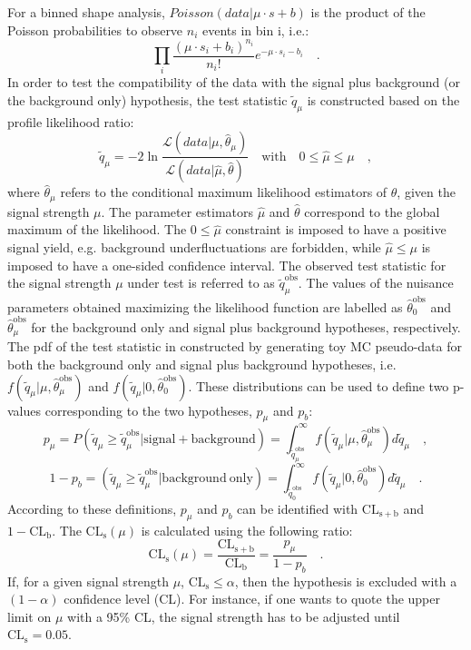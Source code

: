 For a binned shape analysis, $Poisson(data|\mu\cdot s + b)$ is the product of the Poisson probabilities to observe $n_i$ events in bin i, i.e.:
\begin{equation}
\prod_i \frac{(\mu\cdot s_i + b_i)^{n_i}}{n_i !} e^{-\mu\cdot s_i - b_i} \quad.
\end{equation}
In order to test the compatibility of the data with the signal plus background (or the background only) hypothesis, the test statistic $\tilde{q}_\mu$ is constructed based on the profile likelihood ratio:
\begin{equation}
\tilde{q}_\mu = -2 \ln{\frac{\mathcal{L}(data|\mu,\hat{\theta}_\mu)}{\mathcal{L}(data|\hat{\mu},\hat{\theta})	}}  \quad \mathrm{with} \quad 0 \leq \hat{\mu} \leq \mu \quad ,
\end{equation}
where $\hat{\theta}_\mu$ refers to the conditional maximum likelihood estimators of $\theta$, given the signal strength $\mu$. The parameter estimators $\hat{\mu}$ and $\hat{\theta}$ correspond to the global maximum of the likelihood. The $0 \leq \hat{\mu}$ constraint is imposed to have a positive signal yield, e.g. background underfluctuations are forbidden, while $\hat{\mu} \leq \mu$ is imposed to have a one-sided confidence interval. The observed test statistic for the signal strength $\mu$ under test is referred to as $\tilde{q}_\mu^\mathrm{obs}$. The values of the nuisance parameters obtained maximizing the likelihood function are labelled as $\hat{\theta}_0^\mathrm{obs}$ and $\hat{\theta}_\mu^\mathrm{obs}$ for the background only and signal plus background hypotheses, respectively. The pdf of the test statistic in constructed by generating toy MC pseudo-data for both the background only and signal plus background hypotheses, i.e. $f(\tilde{q}_\mu|\mu,\hat{\theta}_\mu^\mathrm{obs})$ and $f(\tilde{q}_\mu|0,\hat{\theta}_0^\mathrm{obs})$. These distributions can be used to define two p-values corresponding to the two hypotheses, $p_\mu$ and $p_b$:
\begin{equation}
p_\mu = P(\tilde{q}_\mu \geq \tilde{q}_\mu^\mathrm{obs}|\mathrm{signal+background}) = \int_{\tilde{q}_\mu^\mathrm{obs}}^{\infty} f(\tilde{q}_\mu|\mu,\hat{\theta}_\mu^\mathrm{obs}) d\tilde{q}_\mu \quad ,
\end{equation}
\begin{equation}
1 - p_b = (\tilde{q}_\mu \geq \tilde{q}_\mu^\mathrm{obs}|\mathrm{background~only}) = \int_{\tilde{q}_0^\mathrm{obs}}^{\infty} f(\tilde{q}_\mu|0,\hat{\theta}_0^\mathrm{obs}) d\tilde{q}_\mu \quad .
\end{equation}
According to these definitions, $p_\mu$ and $p_b$ can be identified with $\mathrm{CL_{s+b}}$ and $1-\mathrm{CL_b}$.
The $\mathrm{CL_s}(\mu)$ is calculated using the following ratio:
\begin{equation}
\mathrm{CL_s}(\mu) = \frac{\mathrm{CL_{s+b}}}{\mathrm{CL_b}} = \frac{p_\mu}{1-p_b} \quad .
\end{equation}
If, for a given signal strength $\mu$, $\mathrm{CL_s} \leq \alpha$, then the hypothesis is excluded with a $(1-\alpha)$ confidence level (CL). For instance, if one wants to quote the upper limit on $\mu$ with a 95\% CL, the signal strength has to be adjusted until $\mathrm{CL_s} = 0.05$.


